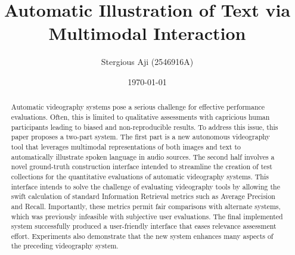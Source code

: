 \documentclass{l4proj}
\begin{document}
\title{Automatic Illustration of Text via Multimodal Interaction}
\author{Stergious Aji (2546916A)}
\date{\today}

\maketitle

\begin{abstract}
    Automatic videography systems pose a serious challenge for effective performance evaluations. Often, this is limited to qualitative assessments with capricious human participants leading to biased and non-reproducible results. To address this issue, this paper proposes a two-part system. The first part is a new autonomous videography tool that leverages multimodal representations of both images and text to automatically illustrate spoken language in audio sources. The second half involves a novel ground-truth construction interface intended to streamline the creation of test collections for the quantitative evaluations of automatic videography systems. This interface intends to solve the challenge of evaluating videography tools by allowing the swift calculation of standard Information Retrieval metrics such as Average Precision and Recall. Importantly, these metrics permit fair comparisons with alternate systems, which was previously infeasible with subjective user evaluations. The final implemented system successfully produced a user-friendly interface that eases relevance assessment effort. Experiments also demonstrate that the new system enhances many aspects of the preceding videography system.

\end{abstract}

%
\end{document}
